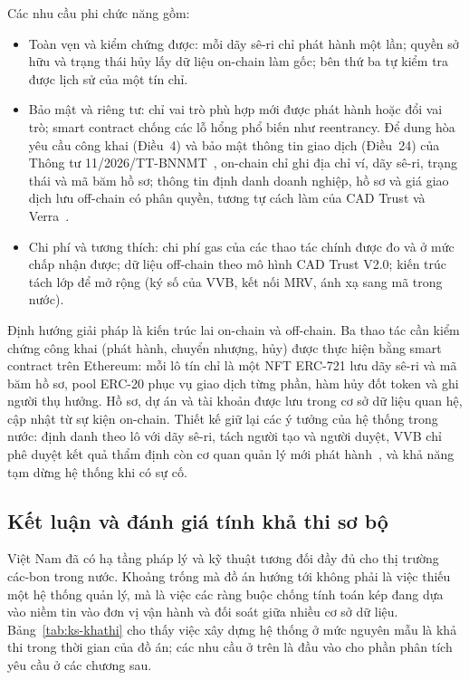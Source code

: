 Các nhu cầu phi chức năng gồm:
\begin{itemize}
    \item Toàn vẹn và kiểm chứng được: mỗi dãy sê-ri chỉ phát hành một lần; quyền sở hữu và trạng thái hủy lấy dữ liệu on-chain làm gốc; bên thứ ba tự kiểm tra được lịch sử của một tín chỉ.
    \item Bảo mật và riêng tư: chỉ vai trò phù hợp mới được phát hành hoặc đổi vai trò; smart contract chống các lỗ hổng phổ biến như reentrancy. Để dung hòa yêu cầu công khai (Điều~4) và bảo mật thông tin giao dịch (Điều~24) của Thông tư 11/2026/TT-BNNMT~\cite{vietnam2026thongtu11}, on-chain chỉ ghi địa chỉ ví, dãy sê-ri, trạng thái và mã băm hồ sơ; thông tin định danh doanh nghiệp, hồ sơ và giá giao dịch lưu off-chain có phân quyền, tương tự cách làm của CAD Trust và Verra~\cite{cadtrust2025datamodel,verra2020registryv2}.
    \item Chi phí và tương thích: chi phí gas của các thao tác chính được đo và ở mức chấp nhận được; dữ liệu off-chain theo mô hình CAD Trust V2.0; kiến trúc tách lớp để mở rộng (ký số của VVB, kết nối MRV, ánh xạ sang mã trong nước).
\end{itemize}

Định hướng giải pháp là kiến trúc lai on-chain và off-chain. Ba thao tác cần kiểm chứng công khai (phát hành, chuyển nhượng, hủy) được thực hiện bằng smart contract trên Ethereum: mỗi lô tín chỉ là một NFT ERC-721 lưu dãy sê-ri và mã băm hồ sơ, pool ERC-20 phục vụ giao dịch từng phần, hàm hủy đốt token và ghi người thụ hưởng. Hồ sơ, dự án và tài khoản được lưu trong cơ sở dữ liệu quan hệ, cập nhật từ sự kiện on-chain. Thiết kế giữ lại các ý tưởng của hệ thống trong nước: định danh theo lô với dãy sê-ri, tách người tạo và người duyệt, VVB chỉ phê duyệt kết quả thẩm định còn cơ quan quản lý mới phát hành~\cite{mae2025qd2935,vietnam2026nghidinh396}, và khả năng tạm dừng hệ thống khi có sự cố.

\FloatBarrier
\subsection*{Kết luận và đánh giá tính khả thi sơ bộ}
\label{subsec:ks-khathi}

Việt Nam đã có hạ tầng pháp lý và kỹ thuật tương đối đầy đủ cho thị trường các-bon trong nước. Khoảng trống mà đồ án hướng tới không phải là việc thiếu một hệ thống quản lý, mà là việc các ràng buộc chống tính toán kép đang dựa vào niềm tin vào đơn vị vận hành và đối soát giữa nhiều cơ sở dữ liệu. Bảng~\ref{tab:ks-khathi} cho thấy việc xây dựng hệ thống ở mức nguyên mẫu là khả thi trong thời gian của đồ án; các nhu cầu ở trên là đầu vào cho phần phân tích yêu cầu ở các chương sau.

